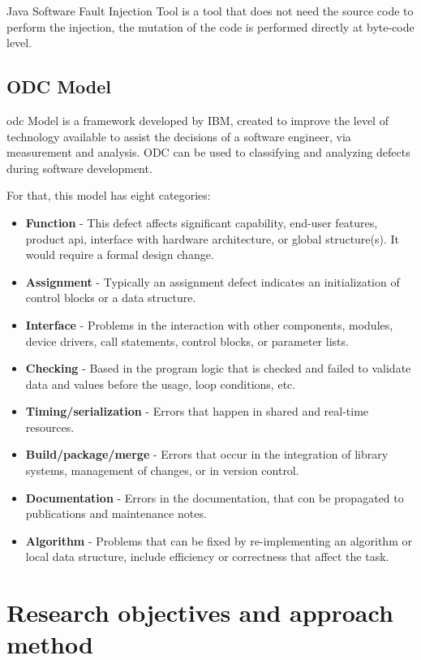 Java Software Fault Injection Tool\cite{sanches2011j} is a tool that does not need the source code to perform the injection, the mutation of the code is performed directly at byte-code level.

\clearpage
\subsection{ODC Model}
\acl{odc}\cite{bridge1998orthogonal} Model is a framework developed by IBM\cite{chillarege2004orthogonal}, created to improve the level of technology available to assist the decisions of a software engineer, via measurement and analysis.
ODC can be used to classifying and analyzing defects during software development.

For that, this model has eight categories:

\begin{itemize}
	\item \textbf{Function} - This defect affects significant capability, end-user features, product \acl{api}, interface with hardware architecture, or global structure(s). It would require a formal design change.
	\item \textbf{Assignment} - Typically an assignment defect indicates an initialization of control blocks or a data structure.
	\item \textbf{Interface} - Problems in the interaction with other components, modules, device drivers, call statements, control blocks, or parameter lists.
	\item \textbf{Checking} - Based in the program logic that is checked and failed to validate data and values before the usage, loop conditions, etc.
	\item \textbf{Timing/serialization} - Errors that happen in shared and real-time resources.
	\item \textbf{Build/package/merge} - Errors that occur in the integration of library systems, management of changes, or in version control.
	\item \textbf{Documentation} - Errors in the documentation, that con be propagated to publications and maintenance notes.
	\item \textbf{Algorithm} - Problems that can be fixed by re-implementing an algorithm or local data structure, include efficiency or correctness that affect the task.
\end{itemize}


\newpage
\section{Research objectives and approach method}

